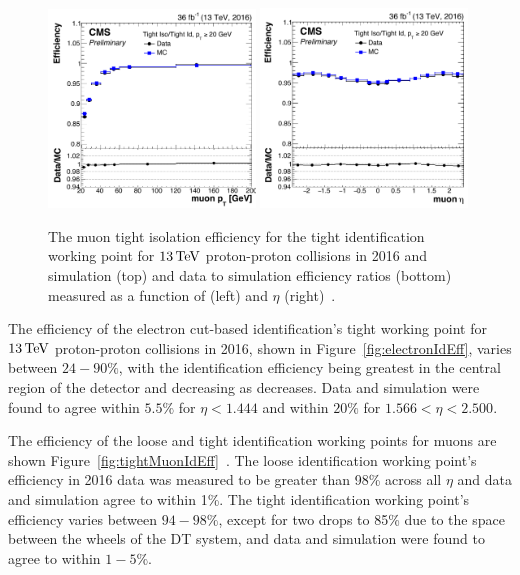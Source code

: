 \begin{figure}[!ht]
\centering
\includegraphics[width=0.49\textwidth]{figs/background-estimation/simulationCorrections/tightMuonIsoEff_pT_2016.pdf}
\includegraphics[width=0.49\textwidth]{figs/background-estimation/simulationCorrections/tightMuonIsoEff_eta_2016.pdf}
\caption{
The muon tight isolation efficiency for the tight identification working point for $13\,\text{Te\hspace{-.08em}V}$ proton-proton collisions in 2016 and simulation (top) and data to simulation efficiency ratios (bottom) measured as a function of \pT (left) and $\eta$ (right)~\cite{CMS-DP-2017-007}.
}
\label{fig:tightMuonIsoEff}
\end{figure}

The efficiency of the electron cut-based identification's tight working point for $13\,\text{Te\hspace{-.08em}V}$ proton-proton collisions in 2016, shown in Figure~\ref{fig:electronIdEff}, varies between $24 - 90\%$, with the identification efficiency being greatest in the central region of the detector and decreasing as \pT decreases.
Data and simulation were found to agree within $5.5\%$ for $\eta < 1.444$ and within $20\%$ for $1.566< \eta < 2.500$.

The efficiency of the loose and tight identification working points for muons are shown Figure~\ref{fig:tightMuonIdEff}~\cite{CMS-DP-2017-007}.
The loose identification working point's efficiency in 2016 data was measured to be greater than 98\% across all $\eta$ and data and simulation agree to within 1\%.
The tight identification working point's efficiency varies between $94 - 98\%$, except for two drops to 85\% due to the space between the wheels of the DT system, and data and simulation were found to agree to within $1-5\%$.


